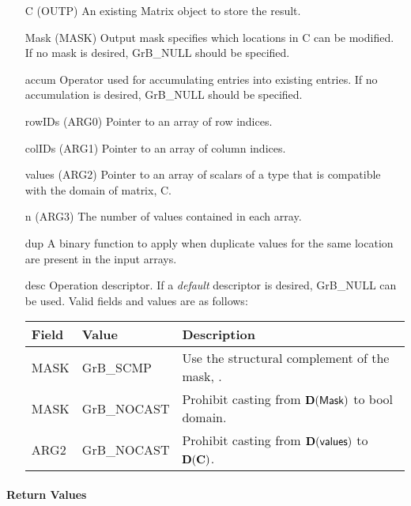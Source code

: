 \begin{itemize}[leftmargin=1.1in]
    \item[{\sf C}]      ({\sf OUTP}) An existing Matrix object to store the result.
    \item[{\sf Mask}]   ({\sf MASK}) Output mask specifies which locations in
                        {\sf C} can be modified.  If no mask is desired,
                        {\sf GrB\_NULL} should be specified.
    \item[{\sf accum}]  Operator used for accumulating entries into existing
                         entries. If no accumulation is desired,
                        {\sf GrB\_NULL} should be specified.
    \item[{\sf rowIDs}] ({\sf ARG0}) Pointer to an array of row indices. 
    \item[{\sf colIDs}] ({\sf ARG1}) Pointer to an array of column indices. 
    \item[{\sf values}] ({\sf ARG2}) Pointer to an array of scalars of a type that
                                     is compatible with the domain of matrix, {\sf C}.
    \item[{\sf n}]      ({\sf ARG3}) The number of values contained in each array.
    \item[{\sf dup}]    A binary function to apply when duplicate values for
                        the same location are present in the input arrays.
                                     
    \item[{\sf desc}]   Operation descriptor. If a
    \emph{default} descriptor is desired, {\sf GrB\_NULL} can be
    used.  Valid fields and values are as follows: \\
    \begin{tabular}{lll}
    Field  & Value & Description \\
    \hline
    {\sf MASK} & {\sf GrB\_SCMP}   & Use the structural complement of the mask, . \\
    {\sf MASK} & {\sf GrB\_NOCAST} & Prohibit casting from $\bold{D}({\sf Mask})$ to {\sf bool} domain. \\
    {\sf ARG2} & {\sf GrB\_NOCAST} & Prohibit casting from $\bold{D}({\sf values})$ to $\bold{D}({\bf C})$. \\
    \end{tabular}
\end{itemize}

\paragraph{Return Values}

